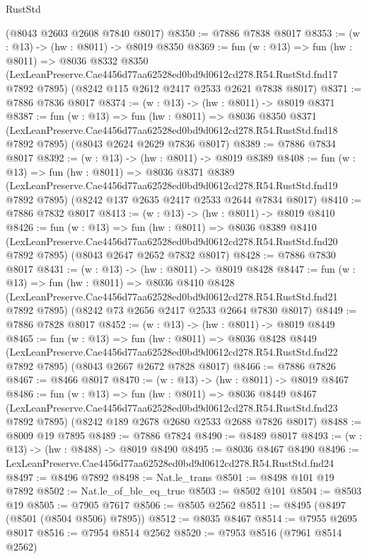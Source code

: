 \begin{lexlean}{RustStd}
\begin{coremodule}
    (@8043 @2603 @2608 @7840 @8017)
@8350 := @7886 @7838 @8017
@8353 := (w : @13) -> (hw : @8011) -> @8019 @8350
@8369 := fun (w : @13) =>
  fun (hw : @8011) =>
  @8036
    @8332
    @8350
    (LexLeanPreserve.Cae4456d77aa62528ed0bd9d0612cd278.R54.RustStd.fnd17 @7892 @7895)
    (@8242 @115 @2612 @2417 @2533 @2621 @7838 @8017)
@8371 := @7886 @7836 @8017
@8374 := (w : @13) -> (hw : @8011) -> @8019 @8371
@8387 := fun (w : @13) =>
  fun (hw : @8011) =>
  @8036
    @8350
    @8371
    (LexLeanPreserve.Cae4456d77aa62528ed0bd9d0612cd278.R54.RustStd.fnd18 @7892 @7895)
    (@8043 @2624 @2629 @7836 @8017)
@8389 := @7886 @7834 @8017
@8392 := (w : @13) -> (hw : @8011) -> @8019 @8389
@8408 := fun (w : @13) =>
  fun (hw : @8011) =>
  @8036
    @8371
    @8389
    (LexLeanPreserve.Cae4456d77aa62528ed0bd9d0612cd278.R54.RustStd.fnd19 @7892 @7895)
    (@8242 @137 @2635 @2417 @2533 @2644 @7834 @8017)
@8410 := @7886 @7832 @8017
@8413 := (w : @13) -> (hw : @8011) -> @8019 @8410
@8426 := fun (w : @13) =>
  fun (hw : @8011) =>
  @8036
    @8389
    @8410
    (LexLeanPreserve.Cae4456d77aa62528ed0bd9d0612cd278.R54.RustStd.fnd20 @7892 @7895)
    (@8043 @2647 @2652 @7832 @8017)
@8428 := @7886 @7830 @8017
@8431 := (w : @13) -> (hw : @8011) -> @8019 @8428
@8447 := fun (w : @13) =>
  fun (hw : @8011) =>
  @8036
    @8410
    @8428
    (LexLeanPreserve.Cae4456d77aa62528ed0bd9d0612cd278.R54.RustStd.fnd21 @7892 @7895)
    (@8242 @73 @2656 @2417 @2533 @2664 @7830 @8017)
@8449 := @7886 @7828 @8017
@8452 := (w : @13) -> (hw : @8011) -> @8019 @8449
@8465 := fun (w : @13) =>
  fun (hw : @8011) =>
  @8036
    @8428
    @8449
    (LexLeanPreserve.Cae4456d77aa62528ed0bd9d0612cd278.R54.RustStd.fnd22 @7892 @7895)
    (@8043 @2667 @2672 @7828 @8017)
@8466 := @7886 @7826
@8467 := @8466 @8017
@8470 := (w : @13) -> (hw : @8011) -> @8019 @8467
@8486 := fun (w : @13) =>
  fun (hw : @8011) =>
  @8036
    @8449
    @8467
    (LexLeanPreserve.Cae4456d77aa62528ed0bd9d0612cd278.R54.RustStd.fnd23 @7892 @7895)
    (@8242 @189 @2678 @2680 @2533 @2688 @7826 @8017)
@8488 := @8009 @19 @7895
@8489 := @7886 @7824
@8490 := @8489 @8017
@8493 := (w : @13) -> (hw : @8488) -> @8019 @8490
@8495 := @8036 @8467 @8490
@8496 := LexLeanPreserve.Cae4456d77aa62528ed0bd9d0612cd278.R54.RustStd.fnd24
@8497 := @8496 @7892
@8498 := Nat.le_trans
@8501 := @8498 @101 @19 @7892
@8502 := Nat.le_of_ble_eq_true
@8503 := @8502 @101
@8504 := @8503 @19
@8505 := @7905 @7617
@8506 := @8505 @2562
@8511 := @8495 (@8497 (@8501 (@8504 @8506) @7895))
@8512 := @8035 @8467
@8514 := @7955 @2695 @8017
@8516 := @7954 @8514 @2562
@8520 := @7953 @8516 (@7961 @8514 @2562)

\end{coremodule}
\end{lexlean}
